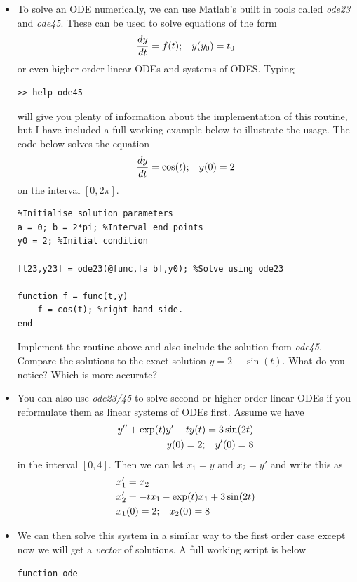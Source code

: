 \documentclass[12pt]{report}
\begin{document}
\begin{itemize}
\item To solve an ODE numerically, we can use Matlab's built in tools called \textit{ode23} and \textit{ode45}. These can be used to solve equations of the form 
\begin{displaymath}
\frac{dy}{dt} = f(t); \hspace{3mm} y(y_0) = t_0
\end{displaymath}
or even higher order linear ODEs and systems of ODES. Typing
\begin{lstlisting}
>> help ode45
\end{lstlisting}
will give you plenty of information about the implementation of this routine, but I have included a full working example below to illustrate the usage. The code below solves the equation 
\begin{displaymath}
\frac{dy}{dt} = \cos(t); \hspace{3mm} y(0) = 2
\end{displaymath}
on the interval $[0, 2\pi]$.
\begin{lstlisting}
%Initialise solution parameters
a = 0; b = 2*pi; %Interval end points
y0 = 2; %Initial condition

[t23,y23] = ode23(@func,[a b],y0); %Solve using ode23

function f = func(t,y)
    f = cos(t); %right hand side.
end
\end{lstlisting}

\begin{tcolorbox}[title=Task]
Implement the routine above and also include the solution from \textit{ode45}. Compare the solutions to the exact solution $y = 2 + \sin(t)$. What do you notice? Which is more accurate?
\end{tcolorbox}

\item You can also use \textit{ode23/45} to solve second or higher order linear ODEs if you reformulate them as linear systems of ODEs first. Assume we have
\begin{align*}
y'' + \exp(t)y' + ty(t) = 3\sin(2t) \\
y(0) = 2; \hspace{3mm} y'(0) = 8
\end{align*}
in the interval $[0, 4]$. Then we can let $x_1 = y$ and $x_2 = y'$ and write this as 
\begin{align*}
x_1' &= x_2 \\
x_2' &=  -tx_1 - \exp(t)x_1 + 3\sin(2t) \\
x_1&(0) = 2; \hspace{3mm} x_2(0) = 8
\end{align*}
\item We can then solve this system in a similar way to the first order case except now we will get a \textit{vector} of solutions. A full working script is below
\begin{lstlisting}
function ode


\end{lstlisting}
\end{itemize}
\end{document}
